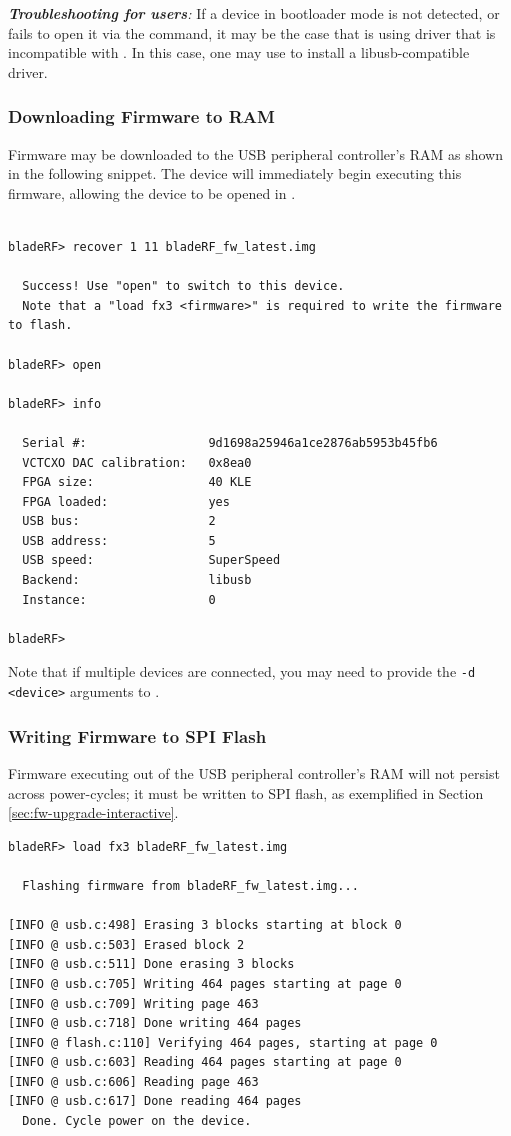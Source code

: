 \textit{\textbf{Troubleshooting for \windows users}:}
If a device in bootloader mode is not detected, or \bladerfcli fails to open it
via the  command, it may be the case that \windows is using driver
that is incompatible with \bladerfcli. In this case, one may use 
 \cite{ZADIG} to install a libusb-compatible driver.

\subsubsection{Downloading Firmware to RAM}
Firmware may be downloaded to the USB peripheral controller's RAM as shown in the
following snippet.  The device will immediately begin executing this firmware,
allowing the device to be opened in \bladerfcli.

{
\noindent\minipage{\linewidth}\medskip
\begin{lstlisting}[style=numbered-snippet]

bladeRF> recover 1 11 bladeRF_fw_latest.img

  Success! Use "open" to switch to this device.
  Note that a "load fx3 <firmware>" is required to write the firmware to flash.

bladeRF> open

bladeRF> info

  Serial #:                 9d1698a25946a1ce2876ab5953b45fb6
  VCTCXO DAC calibration:   0x8ea0
  FPGA size:                40 KLE
  FPGA loaded:              yes
  USB bus:                  2
  USB address:              5
  USB speed:                SuperSpeed
  Backend:                  libusb
  Instance:                 0

bladeRF>
\end{lstlisting}
\endminipage
}

Note that if multiple devices are connected, you may need to provide the
\texttt{-d <device>} arguments to \bladerfcli. \\

\subsubsection{Writing Firmware to SPI Flash}
Firmware executing out of the USB peripheral controller's RAM will not 
persist across power-cycles; it must be written to SPI flash, as exemplified
in Section \ref{sec:fw-upgrade-interactive}. \\

\begin{lstlisting}[style=snippet]
bladeRF> load fx3 bladeRF_fw_latest.img

  Flashing firmware from bladeRF_fw_latest.img...

[INFO @ usb.c:498] Erasing 3 blocks starting at block 0
[INFO @ usb.c:503] Erased block 2
[INFO @ usb.c:511] Done erasing 3 blocks
[INFO @ usb.c:705] Writing 464 pages starting at page 0
[INFO @ usb.c:709] Writing page 463
[INFO @ usb.c:718] Done writing 464 pages
[INFO @ flash.c:110] Verifying 464 pages, starting at page 0
[INFO @ usb.c:603] Reading 464 pages starting at page 0
[INFO @ usb.c:606] Reading page 463
[INFO @ usb.c:617] Done reading 464 pages
  Done. Cycle power on the device.
\end{lstlisting}


